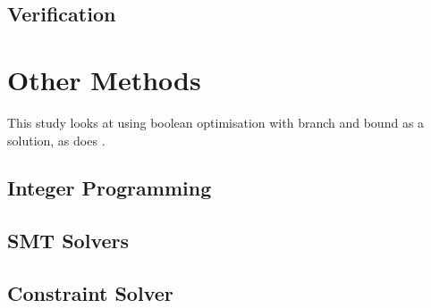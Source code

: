 \subsection{Verification}









\section{Other Methods}
This \cite{Stuckenholz2007} study looks at using boolean optimisation with branch and bound as a solution, as does \cite{Jenson2010a}.


\subsection{Integer Programming}
\subsection{SMT Solvers}
\subsection{Constraint Solver}

